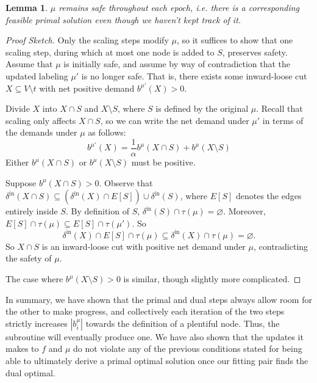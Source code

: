 \documentclass[11pt]{article}
\newtheorem{lemma}[theorem]{Lemma}
\theoremstyle{definition}
\theoremstyle{definition}
\theoremstyle{definition}
\newcommand{\biu}{b_{i}^{\mu}}
\newcommand{\vnott}{V \setminus t}
\newcommand{\din}{\delta^{\text{in}}}
\renewcommand{\todo}[1]{\hl{TODO: #1}}
\begin{document}
    \begin{lemma}
        $\mu$ remains safe throughout each epoch, i.e. there is a corresponding feasible primal
        solution even though we haven't kept track of it.
    \end{lemma}
    \begin{proof}[Proof Sketch]
	Only the scaling steps modify $\mu$, so it suffices to show that one scaling step,
	during which at most one node is added to $S$,
	preserves safety. Assume that $\mu$ is initially safe, and
	assume by way of contradiction that the updated labeling $\mu'$ is no longer safe.
    That is, there exists some inward-loose cut $X \subseteq \vnott$
    with net positive demand $b^{\mu'}(X) > 0$.

    Divide $X$ into $X \cap S$ and $X \setminus S$, where $S$ is defined by the original
    $\mu$.
    Recall that scaling only affects $X \cap S$, so we can write the net demand under $\mu'$
    in terms of the demands under $\mu$ as follows:
    \[ b^{\mu'}(X) = \frac{1}{\alpha}b^{\mu}(X \cap S) + b^{\mu}(X \setminus S) \]
    Either $b^{\mu}(X \cap S)$ or $b^{\mu}(X \setminus S)$ must be positive.
    
    Suppose $b^\mu(X \cap S) > 0$.
    Observe that $\din(X \cap S) \subseteq (\din(X) \cap E[S]) \cup \din(S)$, where $E[S]$
    denotes the edges entirely inside $S$.
    By definition of $S$, $\din(S) \cap \tau(\mu) = \varnothing$. Moreover,
    $E[S] \cap \tau(\mu) \subseteq E[S] \cap \tau(\mu')$. So
    \[ \din(X) \cap E[S] \cap \tau(\mu) \subseteq \din(X) \cap \tau(\mu) = \varnothing. \]
    So $X \cap S$ is an inward-loose cut with positive net demand under $\mu$, contradicting
    the safety of $\mu$.
    
    The case where $b^\mu(X \setminus S) > 0$ is similar, though slightly more complicated.
    \end{proof}

    In summary, we have shown that the primal and dual steps always allow room for the other to make progress, and collectively each iteration of the two steps strictly increases $|\biu|$ towards
    the definition of a plentiful node. Thus, the subroutine will eventually produce one. We have also shown that the updates it makes to $f$ and $\mu$ do not violate any of the previous conditions stated for being able to ultimately derive a primal optimal solution once our fitting pair finds the dual optimal. 

    
\end{document}
